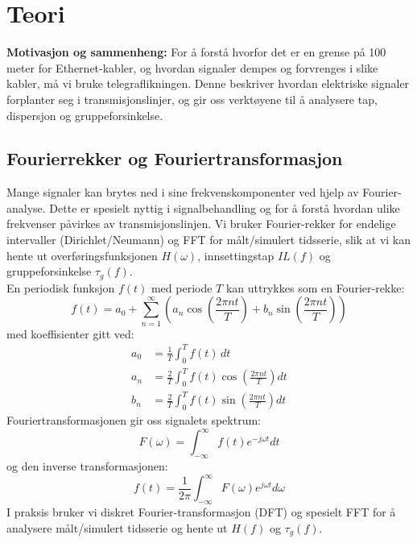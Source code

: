 
\section{Teori}

    \textbf{Motivasjon og sammenheng:} For å forstå hvorfor det er en grense på 100 meter for Ethernet-kabler, og hvordan signaler dempes og forvrenges i slike kabler, må vi bruke telegraflikningen. Denne beskriver hvordan elektriske signaler forplanter seg i transmisjonslinjer, og gir oss verktøyene til å analysere tap, dispersjon og gruppeforsinkelse.

\subsection{Fourierrekker og Fouriertransformasjon}

Mange signaler kan brytes ned i sine frekvenskomponenter ved hjelp av Fourier-analyse. Dette er spesielt nyttig i signalbehandling og for å forstå hvordan ulike frekvenser påvirkes av transmisjonslinjen. Vi bruker Fourier-rekker for endelige intervaller (Dirichlet/Neumann) og FFT for målt/simulert tidsserie, slik at vi kan hente ut overføringsfunksjonen $H(\omega)$, innsettingstap $IL(f)$ og gruppeforsinkelse $\tau_g(f)$.\\[1em]
En periodisk funksjon $f(t)$ med periode $T$ kan uttrykkes som en Fourier-rekke:
\begin{equation}
f(t) = a_0 + \sum_{n=1}^{\infty} \left( a_n \cos\left(\frac{2\pi n t}{T}\right) + b_n \sin\left(\frac{2\pi n t}{T}\right) \right)
\end{equation}
med koeffisienter gitt ved:
\begin{align*}
a_0 &= \frac{1}{T} \int_{0}^{T} f(t) \, dt \\
a_n &= \frac{2}{T} \int_{0}^{T} f(t) \cos\left(\frac{2\pi n t}{T}\right) dt \\
b_n &= \frac{2}{T} \int_{0}^{T} f(t) \sin\left(\frac{2\pi n t}{T}\right) dt
\end{align*}
Fouriertransformasjonen gir oss signalets spektrum:
\begin{equation}
F(\omega) = \int_{-\infty}^{\infty} f(t) e^{-j\omega t} dt
\end{equation}
og den inverse transformasjonen:
\begin{equation}
f(t) = \frac{1}{2\pi} \int_{-\infty}^{\infty} F(\omega) e^{j\omega t} d\omega
\end{equation}
I praksis bruker vi diskret Fourier-transformasjon (DFT) og spesielt FFT for å analysere målt/simulert tidsserie og hente ut $H(f)$ og $\tau_g(f)$.

